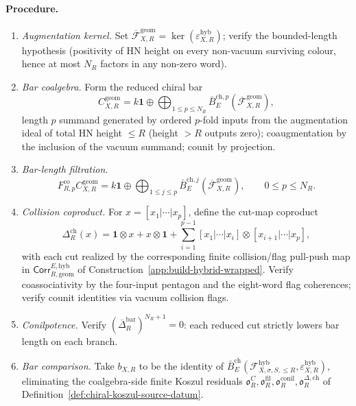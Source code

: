 \paragraph{Procedure.}
\begin{enumerate}
\item \emph{Augmentation kernel.}  Set
\(\overline{\mathcal F}_{X,R}^{\mathrm{geom}}
=\ker(\varepsilon_{X,R}^{\mathrm{hyb}})\); verify the bounded-length
hypothesis (positivity of HN height on every non-vacuum surviving
colour, hence at most \(N_R\) factors in any non-zero word).

\item \emph{Bar coalgebra.}  Form the reduced chiral bar
\[
C_{X,R}^{\mathrm{geom}}
=k\mathbf 1\oplus\bigoplus_{1\le p\le N_R}
\bar B_E^{\mathrm{ch},p}
(\overline{\mathcal F}_{X,R}^{\mathrm{geom}}),
\]
length \(p\) summand generated by ordered \(p\)-fold inputs from the
augmentation ideal of total HN height \(\le R\) (height \(>R\) outputs
zero); coaugmentation by the inclusion of the vacuum summand; counit by
projection.

\item \emph{Bar-length filtration.}
\[
F^{\mathrm{co}}_{R,p}C_{X,R}^{\mathrm{geom}}
=k\mathbf 1\oplus\bigoplus_{1\le j\le p}
\bar B_E^{\mathrm{ch},j}
(\overline{\mathcal F}_{X,R}^{\mathrm{geom}}),\qquad
0\le p\le N_R.
\]

\item \emph{Collision coproduct.}  For
\(x=[x_1|\cdots|x_p]\), define the cut-map coproduct
\[
\Delta_R^{\mathrm{ch}}(x)
=\mathbf1\otimes x+x\otimes\mathbf1
+\sum_{i=1}^{p-1}[x_1|\cdots|x_i]\otimes[x_{i+1}|\cdots|x_p],
\]
with each cut realized by the corresponding finite collision/flag
pull-push map in
\(\mathsf{Corr}^{E,\mathrm{hyb}}_{R,\mathrm{geom}}\) of
Construction~\ref{app:build-hybrid-wrapped}.  Verify
coassociativity by the four-input pentagon and the eight-word flag
coherences; verify counit identities via vacuum collision flags.

\item \emph{Conilpotence.}  Verify
\((\overline\Delta_R^{\mathrm{bar}})^{N_R+1}=0\): each reduced cut
strictly lowers bar length on each branch.

\item \emph{Bar comparison.}  Take \(b_{X,R}\) to be the identity of
\(\bar B_E^{\mathrm{ch}}
(\mathcal F_{X,\sigma,S,\le R}^{\mathrm{hyb}},
\varepsilon_{X,R}^{\mathrm{hyb}})\), eliminating the coalgebra-side
finite Koszul residuals
\(\mathfrak o^C_R, \mathfrak o^{\mathrm{fil}}_R,
\mathfrak o^{\mathrm{conil}}_R, \mathfrak o^{\Delta,\mathrm{ch}}_R\)
of Definition~\ref{def:chiral-koszul-source-datum}.


\end{enumerate}
